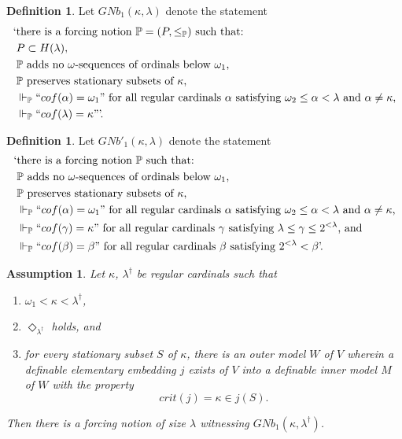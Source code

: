 \documentclass[12pt, twoside]{memoir}
\numberwithin{equation}{section}
\newtheorem{ass}[thm]{Assumption}
\theoremstyle{definition}
\newtheorem{defi}[thm]{Definition}
\theoremstyle{remark}
\theoremstyle{definition}
\theoremstyle{definition}
\theoremstyle{definition}
\theoremstyle{remark}
\begin{document}
\begin{defi}
Let $GNb_1(\kappa, \lambda)$ denote the statement
\begin{align*}
    \text{`} & \text{there is a forcing notion } \mathbb{P} = (P, \leq_{\mathbb{P}}) \text{ such that:} \\
    & P \subset H(\lambda), \\
    & \mathbb{P} \text{ adds no } \omega \text{-sequences of ordinals below } \omega_1 \text{,} \\
    & \mathbb{P} \text{ preserves stationary subsets of } \kappa \text{,} \\
    & \Vdash_{\mathbb{P}} ``cof(\alpha) = \omega_1" \text{ for all regular cardinals } \alpha \text{ satisfying } \omega_2 \leq \alpha < \lambda \text{ and } \alpha \neq \kappa \text{,} \\
    & \Vdash_{\mathbb{P}} ``cof(\lambda) = \kappa" \text{'.}
\end{align*}
\end{defi}

\begin{defi}
Let $GNb'_1(\kappa, \lambda)$ denote the statement
\begin{align*}
    \text{`} & \text{there is a forcing notion } \mathbb{P} \text{ such that:} \\
    & \mathbb{P} \text{ adds no } \omega \text{-sequences of ordinals below } \omega_1 \text{,} \\
    & \mathbb{P} \text{ preserves stationary subsets of } \kappa \text{,} \\
    & \Vdash_{\mathbb{P}} ``cof(\alpha) = \omega_1" \text{ for all regular cardinals } \alpha \text{ satisfying } \omega_2 \leq \alpha < \lambda \text{ and } \alpha \neq \kappa \text{,} \\
    & \Vdash_{\mathbb{P}} ``cof(\gamma) = \kappa" \text{ for all regular cardinals } \gamma \text{ satisfying } \lambda \leq \gamma \leq 2^{< \lambda} \text{, and} \\
    & \Vdash_{\mathbb{P}} ``cof(\beta) = \beta" \text{ for all regular cardinals } \beta \text{ satisfying } 2^{< \lambda} < \beta \text{'.}
\end{align*}
\end{defi}

\begin{ass}\label{thm744}
Let $\kappa$, $\lambda^{\dagger}$ be regular cardinals such that 
\begin{enumerate}[label=(\alph*)]
    \item $\omega_1 < \kappa < \lambda^{\dagger}$,
    \item $\Diamond_{\lambda^{\dagger}}$ holds, and
    \item for every stationary subset $S$ of $\kappa$, there is an outer model $W$ of $V$ wherein a definable elementary embedding $j$ exists of $V$ into a definable inner model $M$ of $W$ with the property
    \begin{equation*}
        crit(j) = \kappa \in j(S) \text{.}
    \end{equation*}
\end{enumerate}
Then there is a forcing notion of size $\lambda$ witnessing $GNb_1(\kappa, \lambda^{\dagger})$.
\end{ass}
\end{document}
